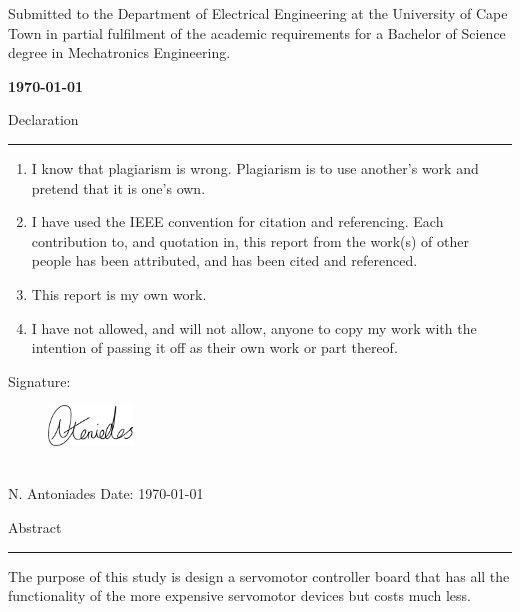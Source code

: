 \documentclass[a4paper,12pt]{report}
\begin{document}
\vskip 10mm
\begin{center}
Submitted to the Department of Electrical Engineering at the University of Cape Town in partial fulfilment of the academic requirements for a Bachelor of Science degree in Mechatronics Engineering.

\end{center}

\vskip 5mm
\begin{center}{\bf \today}
\end{center}
\thispagestyle{empty}
\mbox{}
\newpage

\onehalfspacing
\thispagestyle{empty}
\vskip 40mm


{\Large Declaration}\\
\hrule

\vskip 10mm
\begin{enumerate}
\item I know that plagiarism is wrong. Plagiarism is to use another's work and pretend that it is one's
own.
\item I have used the IEEE convention for citation and referencing. Each contribution to, and quotation in,
this report from the work(s) of other people has been attributed, and has been cited and
referenced.
\item This report is my own work.
\item I have not allowed, and will not allow, anyone to copy my work with the intention of passing it off
as their own work or part thereof.
\end{enumerate}
\vskip 10mm
Signature:
\vspace{-21mm}
\begin{figure}[H]
  \hspace{23mm}  \includegraphics[width=0.2\textwidth]{Signture.png}
\end{figure}
\vspace{-10mm}
\\N. Antoniades
\vskip5mm
Date: \today


\fancyfoot[C]{\thepage}
\pagestyle{plain}
\newpage
{}


\vspace*{20mm}
{\Large Abstract}\\
\hrule
\begingroup
The purpose of this study is design a servomotor controller board that has all the functionality of the more expensive servomotor devices but costs much less.
\end{document}

